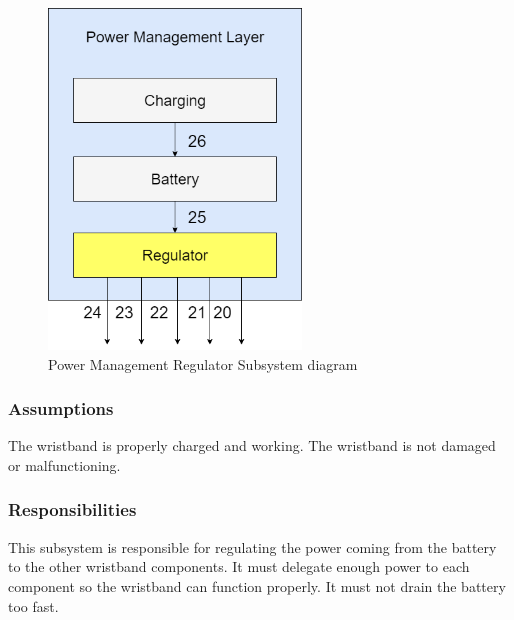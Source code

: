 \begin{figure}[h!]
	\centering
 	\includegraphics[width=0.60\textwidth]{images/PowerMgmtLayer_regulator.drawio.png}
 \caption{Power Management Regulator Subsystem diagram}
\end{figure}

\subsubsection{Assumptions}
The wristband is properly charged and working. The wristband is not damaged or malfunctioning. 

\subsubsection{Responsibilities}
This subsystem is responsible for regulating the power coming from the battery to the other wristband components. It must delegate enough power to each component so the wristband can function properly. It must not drain the battery too fast.

